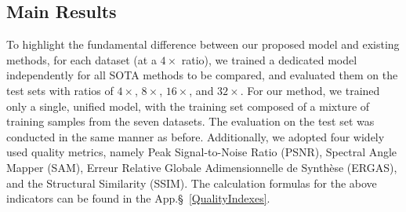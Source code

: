\subsection{Main Results}
To highlight the fundamental difference between our proposed model and existing methods, for each dataset (at a $4 \times$ ratio), we trained a dedicated model independently for all SOTA methods to be compared, and evaluated them on the test sets with ratios of $4 \times$, $8 \times$, $16 \times$, and $32 \times$. For our method, we trained only a single, unified model, with the training set composed of a mixture of training samples from the seven datasets. The evaluation on the test set was conducted in the same manner as before. Additionally, we adopted four widely used quality metrics, namely Peak Signal-to-Noise Ratio (PSNR), Spectral Angle Mapper (SAM), Erreur Relative Globale Adimensionnelle de Synthèse (ERGAS), and the Structural Similarity (SSIM). The calculation formulas for the above indicators can be found in the App.\S~\ref{QualityIndexes}.
